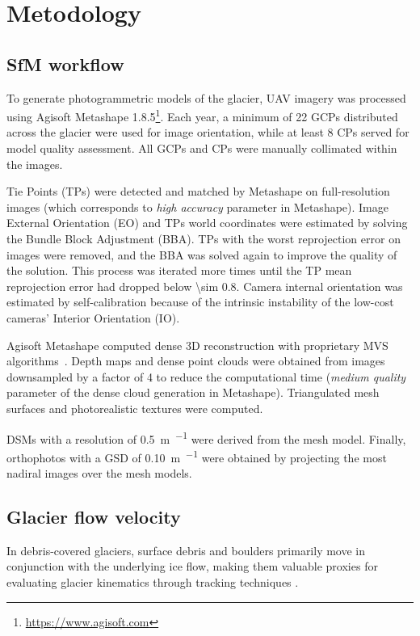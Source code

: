 \section{Metodology}\label{sec:3:methodology}

\subsection{SfM workflow}\label{sec:3:sfm}

To generate photogrammetric models of the glacier, UAV imagery was processed using 
Agisoft Metashape 1.8.5\footnote{\url{https://www.agisoft.com}}.
Each year, a minimum of 22 GCPs distributed across the glacier were used for image 
orientation, while at least 8 CPs served for model quality assessment.  
All GCPs and CPs were manually collimated within the images.

Tie Points (TPs) were detected and matched by Metashape on full-resolution images (which
corresponds to \textit{high accuracy} parameter in Metashape).
Image External Orientation (EO) and TPs world coordinates were estimated by solving the
Bundle Block Adjustment (BBA).
TPs with the worst reprojection error on images were removed, and the BBA was solved again to improve the quality of the solution.
This process was iterated more times until the TP mean reprojection error had dropped below
\SI{\sim 0.8}{\pixel}.
Camera internal orientation was estimated by self-calibration \citep{Fraser2013, Cramer2017} because of the intrinsic instability of the low-cost cameras' Interior Orientation (IO).

Agisoft Metashape computed dense 3D reconstruction with proprietary MVS
algorithms~\citep{Dallasta}.
Depth maps and dense point clouds were obtained from images downsampled by a factor of 4 to reduce the computational time (\textit{medium quality} parameter of the dense cloud generation in Metashape).
Triangulated mesh surfaces and photorealistic textures were computed.

DSMs with a resolution of \SI{0.5}{\meter\per\pixel} were derived from the mesh model.
Finally, orthophotos with a GSD of \SI{0.10}{\meter\per\pixel} were obtained by
projecting the most nadiral images over the mesh models.

\subsection{Glacier flow velocity}\label{sec:3:method_velocity}

In debris-covered glaciers, surface debris and boulders primarily move in conjunction with the underlying ice flow, making them valuable proxies for evaluating glacier kinematics through tracking techniques \citep{Dehecq2015, Blothe2021}.

